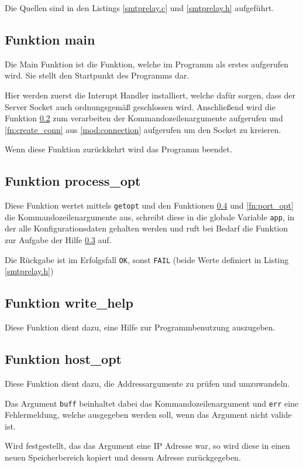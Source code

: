 \documentclass[pdftex,final,a4paper,10pt,notitlepage,halfparskip]{scrreprt}
\begin{document}
Die Quellen sind in den Listings \ref{smtprelay.c} und \ref{smtprelay.h} aufgeführt.

\subsection{Funktion main}\label{fn:main}
Die Main Funktion ist die Funktion, welche im Programm als erstes aufgerufen wird. Sie stellt den Startpunkt des Programms dar.

Hier werden zuerst die Interupt Handler installiert, welche dafür sorgen, dass der Server Socket auch ordnungsgemäß geschlossen wird. Anschließend wird die Funktion \ref{fn:process_opt} zum verarbeiten der Kommandozeilenargumente aufgerufen und \ref{fn:create_conn} aus \ref{mod:connection} aufgerufen um den Socket zu kreieren.

Wenn diese Funktion zurückkehrt wird das Programm beendet.

\subsection{Funktion process\_opt}\label{fn:process_opt}
Diese Funktion wertet mittels \texttt{getopt} und den Funktionen \ref{fn:host_opt} und \ref{fn:port_opt} die Kommandozeilenargumente aus, schreibt diese in die globale Variable \texttt{app}, in der alle Konfigurationsdaten gehalten werden und ruft bei Bedarf die Funktion zur Aufgabe der Hilfe \ref{fn:write_help} auf.

Die Rückgabe ist im Erfolgsfall \texttt{OK}, sonst \texttt{FAIL} (beide Werte definiert in Listing \ref{smtprelay.h})

\subsection{Funktion write\_help}\label{fn:write_help}
Diese Funktion dient dazu, eine Hilfe zur Programmbenutzung auszugeben.

\subsection{Funktion host\_opt}\label{fn:host_opt}
Diese Funktion dient dazu, die Addressargumente zu prüfen und umzuwandeln.

Das Argument \texttt{buff} beinhaltet dabei das Kommandozeilenargument und \texttt{err} eine Fehlermeldung, welche ausgegeben werden soll, wenn das Argument nicht valide ist.

Wird festgestellt, das das Argument eine IP Adresse war, so wird diese in einen neuen Speicherbereich kopiert und dessen Adresse zurückgegeben.
\end{document}
